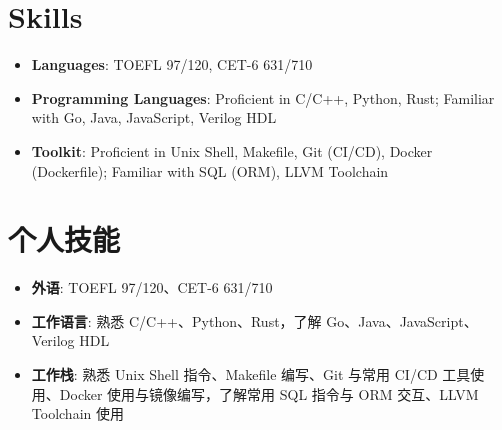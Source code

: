 \ifdefined\english

    \section*{Skills}

    \begin{itemize}
        \item \textbf{Languages}: TOEFL 97/120, CET-6 631/710
        \item \textbf{Programming Languages}: Proficient in C/C++, Python, Rust; Familiar with Go, Java, JavaScript,
              Verilog HDL
        \item \textbf{Toolkit}: Proficient in Unix Shell, Makefile, Git (CI/CD), Docker (Dockerfile); Familiar with SQL
              (ORM), LLVM Toolchain
    \end{itemize}

\else

    \section*{个人技能}

    \begin{itemize}
        \item \textbf{外语}: TOEFL 97/120、CET-6 631/710
        \item \textbf{工作语言}: 熟悉 C/C++、Python、Rust，了解 Go、Java、JavaScript、Verilog HDL
        \item \textbf{工作栈}: 熟悉 Unix Shell 指令、Makefile 编写、Git 与常用 CI/CD 工具使用、Docker 使用与镜像编写，了解常用 SQL 指令与 ORM 交互、LLVM
              Toolchain 使用
    \end{itemize}

\fi
